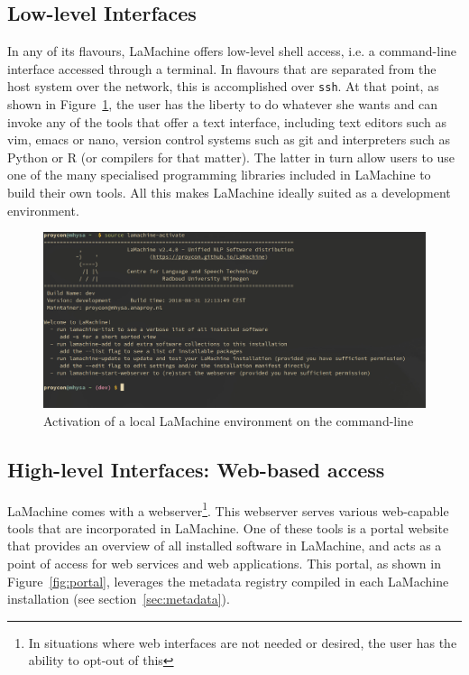 \documentclass[a4paper,11pt]{article}
\begin{document}
\subsection{Low-level Interfaces}

In any of its flavours, LaMachine offers low-level shell access, i.e. a command-line interface accessed through a
terminal. In flavours that are separated from the host system over the network, this is accomplished over \texttt{ssh}.
At that point, as shown in Figure~\ref{fig:venv}, the user has the liberty to do whatever she wants and can invoke any
of the tools that offer a text interface, including text editors such as vim, emacs or nano, version control systems
such as git and interpreters such as Python or R (or compilers for that matter). The latter in turn allow users to use
one of the many specialised programming libraries included in LaMachine to build their own tools. All this makes
LaMachine ideally suited as a development environment.

\begin{figure}[htb] \begin{center}
\includegraphics[width=135.0mm]{screenshot_venv_activate.jpg}
\end{center}
\caption{\footnotesize{Activation of a local LaMachine environment on the command-line}}
\label{fig:venv}
\end{figure}

\subsection{High-level Interfaces: Web-based access}

LaMachine comes with a webserver\footnote{In situations where web interfaces are not needed or desired, the
user has the ability to opt-out of this}. This webserver serves various web-capable tools that are incorporated in LaMachine. One
of these tools is a portal website that provides an overview of all installed software in
LaMachine, and acts as a point of access for web services and web applications. This portal, as shown in
Figure~\ref{fig:portal}, leverages the metadata registry compiled in each LaMachine installation (see
section~\ref{sec:metadata}).
\end{document}
